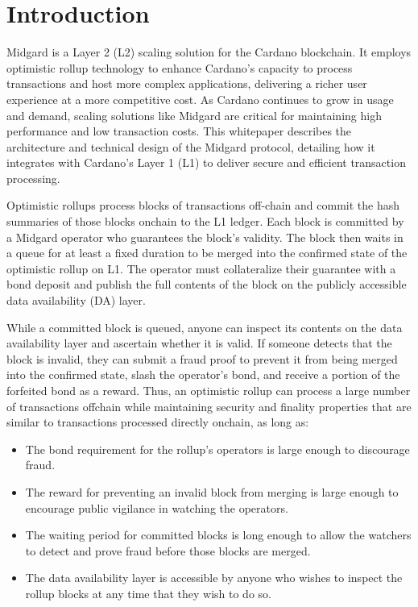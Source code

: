 \documentclass[../midgard.tex]{subfiles}
\begin{document}
\section*{Introduction}
\label{h:introduction}

Midgard is a Layer 2 (L2) scaling solution for the Cardano blockchain. It employs optimistic rollup technology to enhance Cardano's capacity to process transactions and host more complex applications, delivering a richer user experience at a more competitive cost. As Cardano continues to grow in usage and demand, scaling solutions like Midgard are critical for maintaining high performance and low transaction costs. This whitepaper describes the architecture and technical design of the Midgard protocol, detailing how it integrates with Cardano's Layer 1 (L1) to deliver secure and efficient transaction processing.

Optimistic rollups process blocks of transactions off-chain and commit the hash summaries of those blocks onchain to the L1 ledger. Each block is committed by a Midgard operator who guarantees the block's validity. The block then waits in a queue for at least a fixed duration to be merged into the confirmed state of the optimistic rollup on L1. The operator must collateralize their guarantee with a bond deposit and publish the full contents of the block on the publicly accessible data availability (DA) layer.

While a committed block is queued, anyone can inspect its contents on the data availability layer and ascertain whether it is valid. If someone detects that the block is invalid, they can submit a fraud proof to prevent it from being merged into the confirmed state, slash the operator's bond, and receive a portion of the forfeited bond as a reward. Thus, an optimistic rollup can process a large number of transactions offchain while maintaining security and finality properties that are similar to transactions processed directly onchain, as long as:
\begin{itemize}
    \item The bond requirement for the rollup's operators is large enough to discourage fraud.
    \item The reward for preventing an invalid block from merging is large enough to encourage public vigilance in watching the operators.
    \item The waiting period for committed blocks is long enough to allow the watchers to detect and prove fraud before those blocks are merged.
    \item The data availability layer is accessible by anyone who wishes to inspect the rollup blocks at any time that they wish to do so.
\end{itemize}
\end{document}
